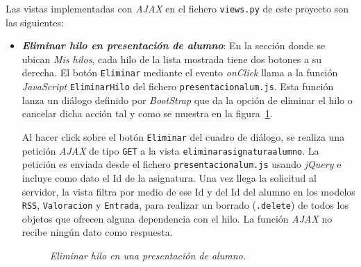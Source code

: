 \documentclass[a4paper, 12pt]{book}
\begin{document}
Las vistas implementadas con \textit{AJAX} en el fichero \texttt{views.py} de este proyecto son las siguientes:

  
\begin{itemize}
  \item {\bfseries \textit{Eliminar hilo en presentaci\'on de alumno}}: En la secci\'on donde se ubican \textit{Mis hilos}, cada hilo de la lista mostrada 
  tiene dos botones a su derecha. El bot\'on \texttt{Eliminar} mediante el evento \textit{onClick} llama a la funci\'on \textit{JavaScript} 
  \texttt{EliminarHilo} del fichero \texttt{presentacionalum.js}. Esta funci\'on lanza un di\'alogo definido por \textit{BootStrap} que da la opci\'on de
  eliminar el hilo o cancelar dicha acci\'on tal y como se muestra en la figura~\ref{fig:eliminarhiloalumno}. 
  
  Al hacer click sobre el bot\'on \texttt{Eliminar} del cuadro de di\'alogo, se realiza una petici\'on \textit{AJAX} de tipo \texttt{GET} a la vista 
  \texttt{eliminarasignaturaalumno}. La petici\'on es enviada desde el fichero \texttt{presentacionalum.js} usando \textit{jQuery} e incluye como dato el 
  Id de la asignatura. Una vez llega la solicitud al servidor, la vista filtra por medio de ese Id y del Id del alumno en los modelos \texttt{RSS}, 
  \texttt{Valoracion} y \texttt{Entrada}, para realizar un borrado (\texttt{.delete}) de todos los objetos que ofrecen alguna dependencia con el hilo. La 
  funci\'on \textit{AJAX} no recibe ning\'un dato como respuesta.
  
  \begin{figure}
    \centering
    \caption{\textit{Eliminar hilo en una presentaci\'on de alumno.}}
    \label{fig:eliminarhiloalumno}
  \end{figure}


\end{itemize}
\end{document}

